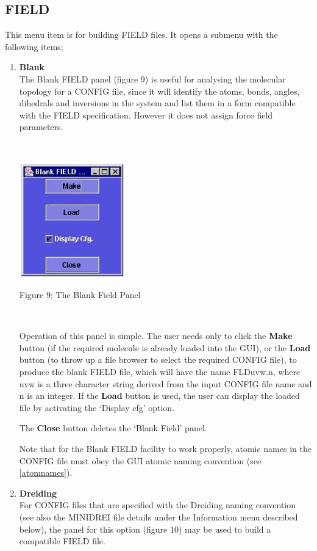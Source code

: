 \subsection{FIELD}
This menu item is for building \DD{} FIELD files. It opens a submenu with
the following items;
\begin{enumerate}
\item {\bf Blank}\\
The Blank FIELD panel (figure 9) is useful for analysing the molecular
topology for a CONFIG file, since it will identify the atoms, bonds,
angles, dihedrals and inversions in the system and list them in a form
compatible with the \DD{} FIELD specification. However it does not assign
force field parameters.

 ~

\vskip 5mm
\centerline{\includegraphics[height=5cm]{blank.ps}}
\centerline{Figure 9: The Blank Field Panel}
\vskip 5mm

~

\noindent
Operation of this panel is simple. The user needs only to click the
{\bf Make} button (if the required molecule is already loaded into the
GUI), or the {\bf Load} button (to throw up a file browser to select
the required CONFIG file), to produce the blank FIELD file, which will
have the name FLDuvw.n, where uvw is a three character string derived
from the input CONFIG file name and n is an integer. If the {\bf Load}
button is used, the user can display the loaded file by activating the
`Display cfg' option. 

The {\bf Close} button deletes the `Blank Field' panel.

Note that for the Blank FIELD facility to work properly, atomic names
in the CONFIG file must obey the GUI atomic naming convention (see \ref{atomnames}).

\item{\bf Dreiding}\\
For CONFIG files that are specified with the Dreiding naming
convention \cite{mayo-90a} (see also the MINIDREI file details under
the Information menu described below), the panel for this option
(figure 10) may be used to build a compatible FIELD file.


\end{enumerate}

